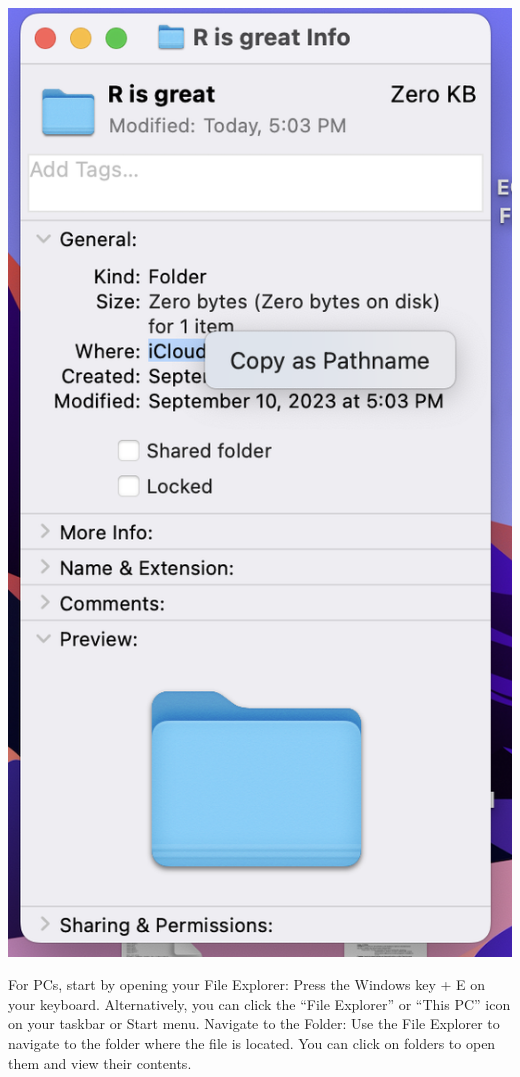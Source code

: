 \documentclass[
]{book}
\begin{document}
\includegraphics{images:/01-intro/copyingpathnamemac.png}

For PCs, start by opening your File Explorer:
Press the Windows key + E on your keyboard.
Alternatively, you can click the ``File Explorer'' or ``This PC'' icon on your taskbar or Start menu.
Navigate to the Folder: Use the File Explorer to navigate to the folder where the file is located. You can click on folders to open them and view their contents.
\end{document}
